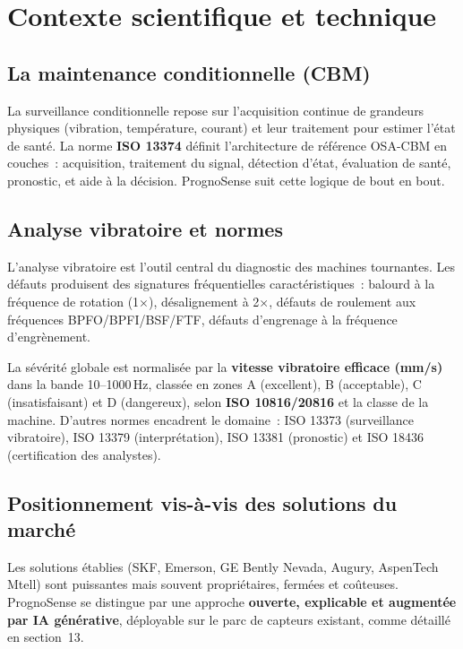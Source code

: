 \documentclass[12pt,a4paper]{article}
\begin{document}
\section{Contexte scientifique et technique}

\subsection{La maintenance conditionnelle (CBM)}
La surveillance conditionnelle repose sur l'acquisition continue de grandeurs physiques
(vibration, température, courant) et leur traitement pour estimer l'état de santé. La
norme \textbf{ISO 13374} définit l'architecture de référence OSA-CBM en couches~:
acquisition, traitement du signal, détection d'état, évaluation de santé, pronostic, et
aide à la décision. PrognoSense suit cette logique de bout en bout.

\subsection{Analyse vibratoire et normes}
L'analyse vibratoire est l'outil central du diagnostic des machines tournantes. Les
défauts produisent des signatures fréquentielles caractéristiques~: balourd à la
fréquence de rotation (1$\times$), désalignement à 2$\times$, défauts de roulement aux
fréquences BPFO/BPFI/BSF/FTF, défauts d'engrenage à la fréquence d'engrènement.

La sévérité globale est normalisée par la \textbf{vitesse vibratoire efficace (mm/s)}
dans la bande 10--1000\,Hz, classée en zones A (excellent), B (acceptable), C
(insatisfaisant) et D (dangereux), selon \textbf{ISO 10816/20816} et la classe de la
machine. D'autres normes encadrent le domaine~: ISO 13373 (surveillance vibratoire),
ISO 13379 (interprétation), ISO 13381 (pronostic) et ISO 18436 (certification des
analystes).

\subsection{Positionnement vis-à-vis des solutions du marché}
Les solutions établies (SKF, Emerson, GE Bently Nevada, Augury, AspenTech Mtell) sont
puissantes mais souvent propriétaires, fermées et coûteuses. PrognoSense se distingue par
une approche \textbf{ouverte, explicable et augmentée par IA générative}, déployable sur
le parc de capteurs existant, comme détaillé en section~13.
\end{document}
